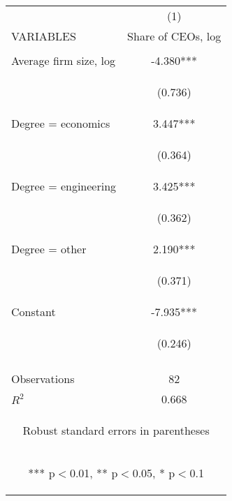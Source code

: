 \begin{center}
\begin{tabular}{lc} \hline
 & (1) \\
VARIABLES & Share of CEOs, log \\ \hline
\vspace{4pt} & \begin{footnotesize}\end{footnotesize} \\
Average firm size, log & -4.380*** \\
\vspace{4pt} & \begin{footnotesize}(0.736)\end{footnotesize} \\
Degree = economics & 3.447*** \\
\vspace{4pt} & \begin{footnotesize}(0.364)\end{footnotesize} \\
Degree = engineering & 3.425*** \\
\vspace{4pt} & \begin{footnotesize}(0.362)\end{footnotesize} \\
Degree = other & 2.190*** \\
\vspace{4pt} & \begin{footnotesize}(0.371)\end{footnotesize} \\
Constant & -7.935*** \\
 & \begin{footnotesize}(0.246)\end{footnotesize} \\
\vspace{4pt} & \begin{footnotesize}\end{footnotesize} \\
Observations & 82 \\
 $R^2$ & 0.668 \\ \hline
\multicolumn{2}{c}{\begin{footnotesize} Robust standard errors in parentheses\end{footnotesize}} \\
\multicolumn{2}{c}{\begin{footnotesize} *** p$<$0.01, ** p$<$0.05, * p$<$0.1\end{footnotesize}} \\
\end{tabular}
\end{center}
